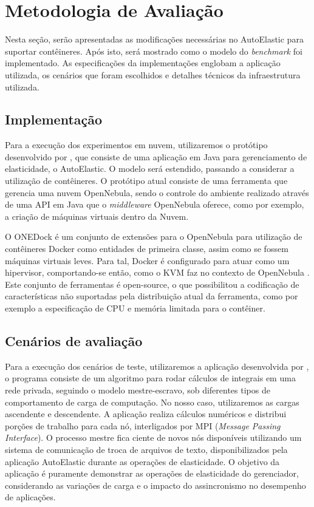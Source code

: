 \documentclass[twoside,english,brazilian]{UNISINOSartigo}
\begin{document}
\section{Metodologia de Avaliação}
\label{metodologia}
Nesta seção, serão apresentadas as modificações necessárias no AutoElastic para suportar contêineres. Após isto, será mostrado como o modelo do \textit{benchmark} foi implementado. As especificações da implementações englobam a aplicação utilizada, os cenários que foram escolhidos e detalhes técnicos da infraestrutura utilizada.

\subsection{Implementação}
\label{prototype}

Para a execução dos experimentos em nuvem, utilizaremos o protótipo desenvolvido por , que consiste de uma aplicação em Java para gerenciamento de elasticidade, o AutoElastic. O modelo será estendido, passando a considerar a utilização de contêineres. O protótipo atual consiste de uma ferramenta que gerencia uma nuvem OpenNebula, sendo o controle do ambiente realizado através de uma API em Java que o \textit{middleware} OpenNebula oferece, como por exemplo, a criação de máquinas virtuais dentro da Nuvem. 

O ONEDock é um conjunto de extensões para o OpenNebula para utilização de contêineres Docker como entidades de primeira classe, assim como se fossem máquinas virtuais leves. Para tal, Docker é configurado para atuar como um hipervisor, comportando-se então, como o KVM faz no contexto de OpenNebula \cite{onedock2015}. Este conjunto de ferramentas é open-source, o que possibilitou a codificação de características não suportadas pela distribuição atual da ferramenta, como por exemplo a especificação de CPU e memória limitada para o contêiner.

\subsection{Cenários de avaliação}
\label{cenarios}

Para a execução dos cenários de teste, utilizaremos a aplicação desenvolvida por , o programa consiste de um algoritmo para rodar cálculos de integrais em uma rede privada, seguindo o modelo mestre-escravo, sob diferentes tipos de comportamento de carga de computação. No nosso caso, utilizaremos as cargas ascendente e descendente. A aplicação realiza cálculos numéricos e distribui porções de trabalho para cada nó, interligados por MPI (\textit{Message Passing Interface}). O processo mestre fica ciente de novos nós disponíveis utilizando um sistema de comunicação de troca de arquivos de texto, disponibilizados pela aplicação AutoElastic durante as operações de elasticidade. O objetivo da aplicação é puramente demonstrar as operações de elasticidade do gerenciador, considerando as variações de carga e o impacto do assincronismo no desempenho de aplicações.
\end{document}
